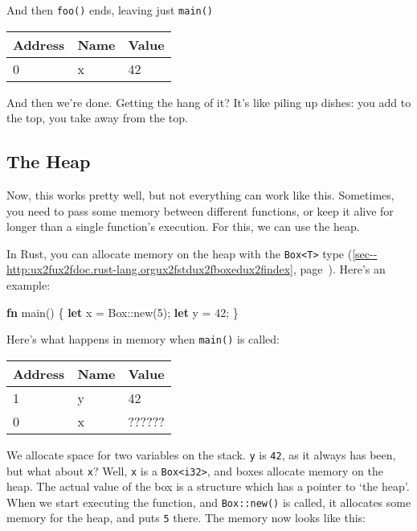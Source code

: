 \documentclass[a4paper,]{book}
\renewcommand*{\hyperref}[2][\ar]{%
  \def\ar{#2}%
  #2 (\autoref{#1}, page~\pageref{#1})}
\newenvironment{Shaded}{\begin{snugshade}}{\end{snugshade}}
\newcommand{\KeywordTok}[1]{\textcolor[rgb]{0.13,0.29,0.53}{\textbf{{#1}}}}
\newcommand{\DecValTok}[1]{\textcolor[rgb]{0.00,0.00,0.81}{{#1}}}
\newcommand{\NormalTok}[1]{{#1}}
\begin{document}
And then \texttt{foo()} ends, leaving just \texttt{main()}

\begin{longtable}[c]{@{}lll@{}}
\toprule
Address & Name & Value\tabularnewline
\midrule
\endhead
0 & x & 42\tabularnewline
\bottomrule
\end{longtable}

And then we're done. Getting the hang of it? It's like piling up dishes:
you add to the top, you take away from the top.

\subsection{The Heap}\label{the-heap}

Now, this works pretty well, but not everything can work like this.
Sometimes, you need to pass some memory between different functions, or
keep it alive for longer than a single function's execution. For this,
we can use the heap.

In Rust, you can allocate memory on the heap with the
\hyperref[sec--http:ux2fux2fdoc.rust-lang.orgux2fstdux2fboxedux2findex]{\texttt{Box\textless{}T\textgreater{}}
type}. Here's an example:

\begin{Shaded}
\begin{Highlighting}[]
\KeywordTok{fn} \NormalTok{main() \{}
    \KeywordTok{let} \NormalTok{x = Box::new(}\DecValTok{5}\NormalTok{);}
    \KeywordTok{let} \NormalTok{y = }\DecValTok{42}\NormalTok{;}
\NormalTok{\}}
\end{Highlighting}
\end{Shaded}

Here's what happens in memory when \texttt{main()} is called:

\begin{longtable}[c]{@{}lll@{}}
\toprule
Address & Name & Value\tabularnewline
\midrule
\endhead
1 & y & 42\tabularnewline
0 & x & ??????\tabularnewline
\bottomrule
\end{longtable}

We allocate space for two variables on the stack. \texttt{y} is
\texttt{42}, as it always has been, but what about \texttt{x}? Well,
\texttt{x} is a \texttt{Box\textless{}i32\textgreater{}}, and boxes
allocate memory on the heap. The actual value of the box is a structure
which has a pointer to `the heap'. When we start executing the function,
and \texttt{Box::new()} is called, it allocates some memory for the
heap, and puts \texttt{5} there. The memory now looks like this:
\end{document}
